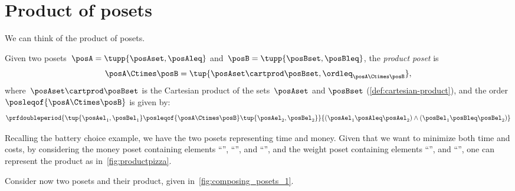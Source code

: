 
\section{Product of posets}
We can think of the product of posets.

\begin{definition}
	\label{def:productposet}
	Given two posets~$\posA=\tupp{\posAset, \posAleq}$ and~$\posB=\tupp{\posBset, \posBleq}$, the \emph{product poset} is
	\begin{equation}
		\posA\Ctimes \posB=\tup{\posAset \cartprod \posBset, \ordleq_{\posA\Ctimes \posB}},
	\end{equation}
	where~$\posAset \cartprod \posBset$ is the Cartesian product of the sets~$\posAset$ and $\posBset$ (\cref{def:cartesian-product}), and the order~$\posleqof{\posA \Ctimes \posB}$ is given by:
	\begin{equation}
		\prfdoubleperiod{\tup{\posAel_1, \posBel_1}
			\posleqof{\posA\Ctimes \posB}
			\tup{\posAel_2, \posBel_2}}{(\posAel_1 \posAleq \posAel_2) \wedge
			(\posBel_1 \posBleq \posBel_2)}
	\end{equation}
\end{definition}
Recalling the battery choice example, we have the two posets representing time and money.
Given that we want to minimize both time and costs, by considering the money poset containing elements ``\poscheap'', ``\posmidrange'', and ``\posexpensive'', and the weight poset containing elements ``\poslight'', and ``\posheavy'', one can represent the product as in~\cref{fig:productpizza}.

\begin{figure*}[h!]
	\centering
	\caption{Product poset of time and weight for battery choices.}
	\label{fig:productpizza}
\end{figure*}

\begin{example}
	Consider now two posets and their product, given in~\cref{fig:composing_posets_1}.
	\begin{figure*}[h!]
		\caption{Product of two posets.}
		\label{fig:composing_posets_1}
	\end{figure*}
\end{example}
\vfill
\clearpage

